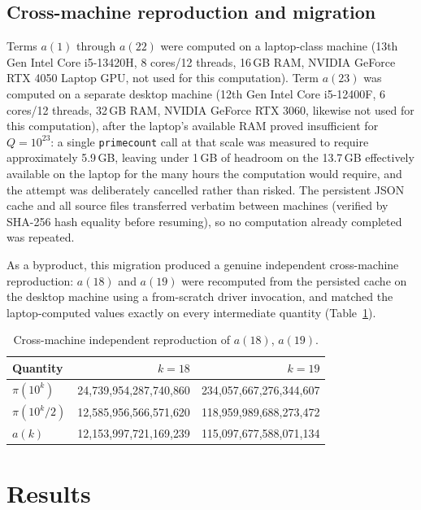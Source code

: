 \documentclass[11pt]{amsart}
\newcommand{\pcount}{\pi}
\begin{document}
\subsection{Cross-machine reproduction and migration}
\label{sec:hardware}

Terms $a(1)$ through $a(22)$ were computed on a laptop-class machine (13th
Gen Intel Core i5-13420H, 8 cores/12 threads, 16\,GB RAM, NVIDIA GeForce
RTX 4050 Laptop GPU, not used for this computation). Term $a(23)$ was
computed on a separate desktop machine (12th Gen Intel Core i5-12400F, 6
cores/12 threads, 32\,GB RAM, NVIDIA GeForce RTX 3060, likewise not used
for this computation), after the laptop's available RAM proved
insufficient for $Q=10^{23}$: a single \texttt{primecount} call at that
scale was measured to require approximately 5.9\,GB, leaving under 1\,GB
of headroom on the 13.7\,GB effectively available on the laptop for the
many hours the computation would require, and the attempt was
deliberately cancelled rather than risked. The persistent JSON cache and
all source files transferred verbatim between machines (verified by
SHA-256 hash equality before resuming), so no computation already
completed was repeated.

As a byproduct, this migration produced a genuine independent
cross-machine reproduction: $a(18)$ and $a(19)$ were recomputed from the
persisted cache on the desktop machine using a from-scratch driver
invocation, and matched the laptop-computed values exactly on every
intermediate quantity (Table~\ref{tab:crossmachine}).

\begin{table}[h]
\centering
\caption{Cross-machine independent reproduction of $a(18)$, $a(19)$.}
\label{tab:crossmachine}
\begin{tabular}{lrr}
\toprule
Quantity & $k=18$ & $k=19$ \\
\midrule
$\pcount(10^k)$ & 24{,}739{,}954{,}287{,}740{,}860 & 234{,}057{,}667{,}276{,}344{,}607 \\
$\pcount(10^k/2)$ & 12{,}585{,}956{,}566{,}571{,}620 & 118{,}959{,}989{,}688{,}273{,}472 \\
$a(k)$ & 12{,}153{,}997{,}721{,}169{,}239 & 115{,}097{,}677{,}588{,}071{,}134 \\
\bottomrule
\end{tabular}
\end{table}

\section{Results}
\label{sec:results}
\end{document}
